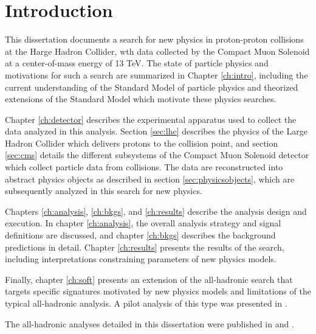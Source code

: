 \chapter{Introduction}
\label{ch:introduction}

This dissertation documents a search for new physics in proton-proton collisions at the Harge Hadron Collider, wth data collected by the Compact Muon Solenoid at a center-of-mass energy of 13 TeV. The state of particle physics and motivations for such a search are summarized in Chapter \ref{ch:intro}, including the current understanding of the Standard Model of particle physics and theorized extensions of the Standard Model which motivate these physics searches.

Chapter \ref{ch:detector} describes the experimental apparatus used to collect the data analyzed in this analysis. Section \ref{sec:lhc} describes the physics of the Large Hadron Collider which delivers protons to the collision point, and section \ref{sec:cms} details the different subsystems of the Compact Muon Solenoid detector which collect particle data from collisions. The data are reconstructed into abstract physics objects as described in section \ref{sec:physicsobjects}, which are subsequently analyzed in this search for new physics.

Chapters \ref{ch:analysis}, \ref{ch:bkgs}, and \ref{ch:results} describe the analysis design and execution. In chapter \ref{ch:analysis}, the overall analysis strategy and signal definitions are discussed, and chapter \ref{ch:bkgs} describes the background predictions in detail. Chapter \ref{ch:results} presents the results of the search, including interpretations constraining parameters of new physics models.

Finally, chapter \ref{ch:soft} presents an extension of the all-hadronic search that targets specific signatures motivated by new physics models and limitations of the typical all-hadronic analysis. A pilot analysis of this type was presented in \cite{CMS-PAS-SUS-16-011}.

The all-hadronic analyses detailed in this dissertation were published in \cite{mt2_2016} and \cite{mt2_2017}.

